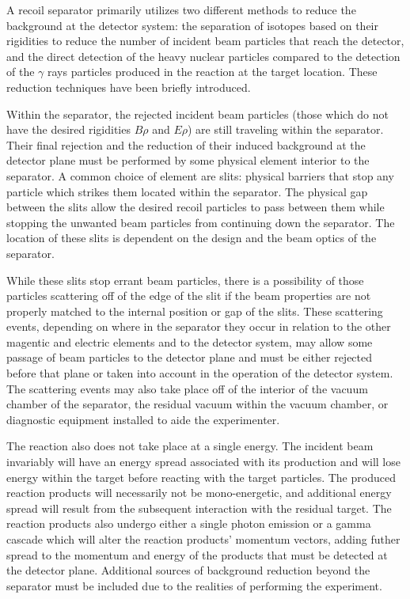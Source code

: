 A recoil separator primarily utilizes two different methods to reduce the
background at the detector system: the separation of isotopes based on their
rigidities to reduce the number of incident beam particles that reach the
detector, and the direct detection of the heavy nuclear particles compared to
the detection of the $\gamma$ rays particles produced in the reaction at the
target location. These reduction techniques have been briefly introduced.

Within the separator, the rejected incident beam particles (those which do not
have the desired rigidities $B\rho$ and $E\rho$) are still traveling within
the separator. Their final rejection and the reduction of their induced
background at the detector plane must be performed by some physical element
interior to the separator. A common choice of element are slits: physical
barriers that stop any particle which strikes them located within the
separator. The physical gap between the slits allow the desired recoil
particles to pass between them while stopping the unwanted beam particles from
continuing down the separator. The location of these slits is dependent on the
design and the beam optics of the separator.

While these slits stop errant beam particles, there is a possibility of those
particles scattering off of the edge of the slit if the beam properties are
not properly matched to the internal position or gap of the slits. These
scattering events, depending on where in the separator they occur in relation
to the other magentic and electric elements and to the detector system, may
allow some passage of beam particles to the detector plane and must be either
rejected before that plane or taken into account in the operation of the
detector system. The scattering events may also take place off of the interior
of the vacuum chamber of the separator, the residual vacuum within the vacuum
chamber, or diagnostic equipment installed to aide the experimenter.

The reaction also does not take place at a single energy. The incident beam
invariably will have an energy spread associated with its production and will
lose energy within the target before reacting with the target particles. The
produced reaction products will necessarily not be mono-energetic, and
additional energy spread will result from the subsequent interaction with the
residual target. The reaction products also undergo either a single photon
emission or a gamma cascade which will alter the reaction products' momentum
vectors, adding futher spread to the momentum and energy of the products that
must be detected at the detector plane. Additional sources of background
reduction beyond the separator must be included due to the realities of
performing the experiment.


